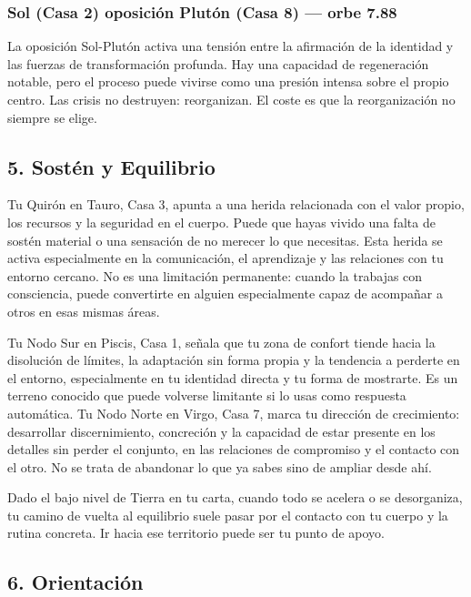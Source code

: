 \documentclass[11pt,a4paper]{article}
\begin{document}
\subsubsection*{Sol (Casa 2) oposición Plutón (Casa 8) --- orbe 7.88\textdegree}
La oposición Sol-Plutón activa una tensión entre la afirmación de la identidad y las fuerzas de transformación profunda. Hay una capacidad de regeneración notable, pero el proceso puede vivirse como una presión intensa sobre el propio centro. Las crisis no destruyen: reorganizan. El coste es que la reorganización no siempre se elige.



\subsection{5. Sostén y Equilibrio}

Tu Quirón en Tauro, Casa 3, apunta a una herida relacionada con el valor propio, los recursos y la seguridad en el cuerpo. Puede que hayas vivido una falta de sostén material o una sensación de no merecer lo que necesitas. Esta herida se activa especialmente en la comunicación, el aprendizaje y las relaciones con tu entorno cercano. No es una limitación permanente: cuando la trabajas con consciencia, puede convertirte en alguien especialmente capaz de acompañar a otros en esas mismas áreas.

\vspace{0.3cm}
Tu Nodo Sur en Piscis, Casa 1, señala que tu zona de confort tiende hacia la disolución de límites, la adaptación sin forma propia y la tendencia a perderte en el entorno, especialmente en tu identidad directa y tu forma de mostrarte. Es un terreno conocido que puede volverse limitante si lo usas como respuesta automática. Tu Nodo Norte en Virgo, Casa 7, marca tu dirección de crecimiento: desarrollar discernimiento, concreción y la capacidad de estar presente en los detalles sin perder el conjunto, en las relaciones de compromiso y el contacto con el otro. No se trata de abandonar lo que ya sabes sino de ampliar desde ahí.

\vspace{0.3cm}
Dado el bajo nivel de Tierra en tu carta, cuando todo se acelera o se desorganiza, tu camino de vuelta al equilibrio suele pasar por el contacto con tu cuerpo y la rutina concreta. Ir hacia ese territorio puede ser tu punto de apoyo.

\subsection{6. Orientación}
\end{document}
